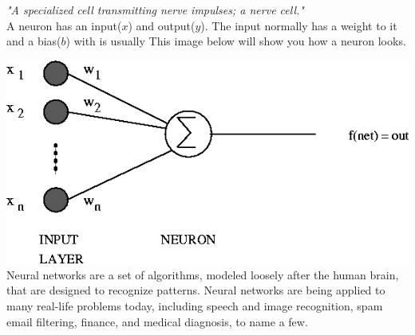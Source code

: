 \documentclass[conference,compsoc]{IEEEtran}
\begin{document}
\textit{"A specialized cell transmitting nerve impulses; a nerve cell."} \\ A neuron has an input($x$) and output($y$). The input normally has a weight to it and a bias($b$) with is usually This image below will show you how a neuron looks.

\includegraphics[scale=.4]{Neuron.png}
Neural networks are a set of algorithms, modeled loosely after the human brain, that are designed to recognize patterns. Neural networks are being applied to many real-life problems today, including speech and image recognition, spam email filtering, finance, and medical diagnosis, to name a few.
\end{document}
